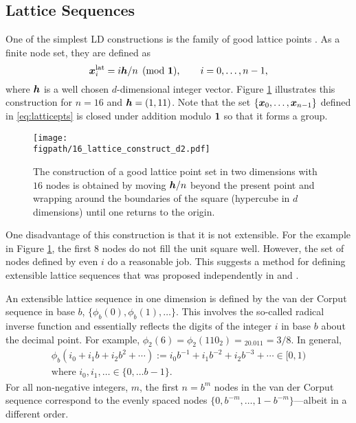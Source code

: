 \documentclass{svproc}
\newcommand{\figpath}{Figures}
\begin{document}
\subsection{Lattice Sequences} \label{sec:lattice}
One of the simplest LD constructions is the family of good lattice points \cite{DicEtal22a,SloJoe94}.  As a finite node set, they are defined as
\begin{equation} \label{eq:latticepts}
	{\boldsymbol{x}}_i^{\text{lat}} = i{\boldsymbol{h}}/n \pmod {{\boldsymbol{1}}}, \qquad i = 0, \ldots, n-1,
\end{equation}
where ${\boldsymbol{h}}$ is a well chosen $d$-dimensional integer vector. Figure \ref{fig:latticeconstruct} illustrates this construction for $n = 16$ and ${\boldsymbol{h}} = (1,11)$.  Note that the set $\{{\boldsymbol{x}}_0, \ldots, {\boldsymbol{x}}_{n-1}\}$ defined in \eqref{eq:latticepts} is closed under addition modulo ${\boldsymbol{1}}$ so that it forms a group.


\begin{figure}
	\centering
	\texttt{[image: \\figpath/16\_lattice\_construct\_d2.pdf]}
	\caption{The construction of a good lattice point set in two dimensions with $16$ nodes is obtained by moving ${\boldsymbol{h}}/n$ beyond the present point and wrapping around the boundaries of the square (hypercube in $d$ dimensions) until one returns to the origin. \label{fig:latticeconstruct}}
\end{figure}


One disadvantage of this construction is that it is not extensible. For the example in Figure \ref{fig:latticeconstruct}, the first $8$ nodes do not fill the unit square well.  However, the set of nodes defined by even $i$ do a reasonable job.  This suggests a method for defining extensible lattice sequences that was proposed independently in \cite{Mai81a} and \cite{HicEtal00}.

An extensible lattice sequence in one dimension is defined by the van der Corput sequence in base $b$, $\{\phi_b(0), \phi_b(1), \ldots\}$. This involves the so-called radical inverse function and essentially reflects the digits of the integer $i$ in base $b$ about the decimal point. For example, $\phi_2(6) = \phi_2(110_{2}) = {}_20.011 = 3/8$.  In general,
\begin{multline} \label{eq:vdc}
	\phi_b(i_0 + i_1b + i_2 b^2 + \cdots ) := i_0 b^{-1} + i_1 b^{-2} + i_2 b^{-3} + \cdots \in [0,1)
	\\
	 \text{where } i_0, i_1, \ldots \in \{0,\ldots b-1\}.
\end{multline}
For all non-negative integers, $m$, the first $n = b^m$ nodes in the van der Corput sequence correspond to the evenly spaced nodes $\{0, b^{-m}, \ldots, 1 - b^{-m} \}$---albeit in a different order.
\end{document}
